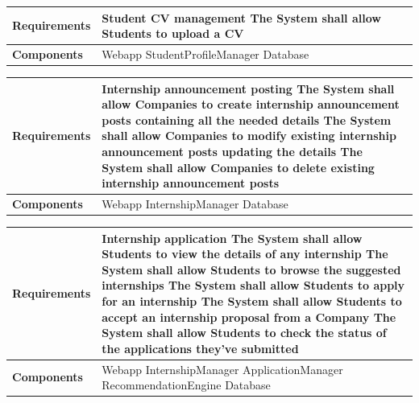 \begin{tabular}{|p{3cm}|p{9cm}|}
    \hline
\textbf{Requirements} & \textbf{Student CV management} \newline [R3] The System shall allow Students to upload a CV \\  \hline
    \textbf{Components} & Webapp \newline StudentProfileManager \newline Database \\ \hline
    \end{tabular}
    \newline
    \newline

\begin{tabular}{|p{3cm}|p{9cm}|}
    \hline
\textbf{Requirements} & \textbf{Internship announcement posting} \newline [R4] The System shall allow Companies to create internship announcement posts containing all the needed details \newline [R5] The System shall allow Companies to modify existing internship announcement posts updating the details \newline [R6] The System shall allow Companies to delete existing internship announcement posts \\  \hline
    \textbf{Components} & Webapp \newline InternshipManager \newline Database \\ \hline
    \end{tabular}
    \newline
    \newline

\begin{tabular}{|p{3cm}|p{9cm}|}
    \hline
\textbf{Requirements} & \textbf{Internship application} \newline [R7] The System shall allow Students to view the details of any internship \newline [R8] The System shall allow Students to browse the suggested internships \newline [R9] The System shall allow Students to apply for an internship \newline [R10] The System shall allow Students to accept an internship proposal from a Company \newline [R11] The System shall allow Students to check the status of the applications they've submitted \\  \hline
    \textbf{Components} & Webapp \newline InternshipManager \newline ApplicationManager \newline RecommendationEngine \newline Database \\ \hline
    \end{tabular}
    \newline
    \newline

